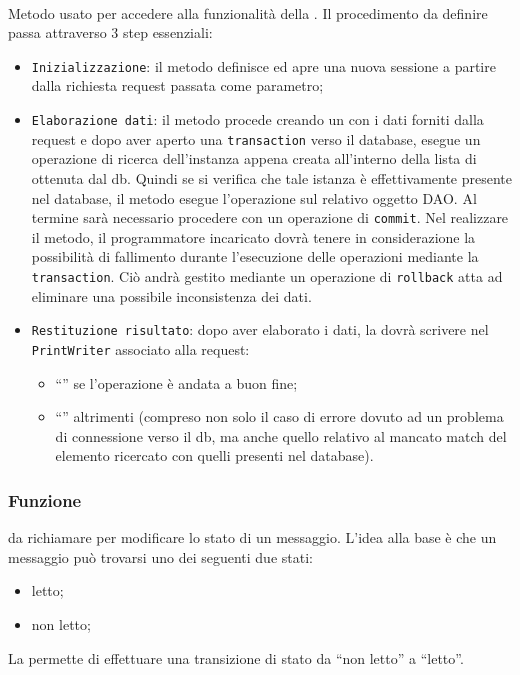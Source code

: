 \begin{description}
	\item{}\\
	Metodo usato per accedere alla funzionalità della . Il procedimento da definire passa attraverso 3 step essenziali:
	\begin{itemize}
		\item \texttt{Inizializzazione}: il metodo definisce ed apre una nuova sessione a partire dalla richiesta request passata come parametro;
		\item \texttt{Elaborazione dati}: il metodo procede creando un  con i dati forniti dalla request e dopo aver aperto una \texttt{transaction} verso il database, esegue un operazione di ricerca dell'instanza appena creata all'interno della lista di  ottenuta dal db. Quindi se si verifica che tale istanza è effettivamente presente nel database, il metodo esegue l'operazione  sul relativo oggetto DAO. Al termine sarà necessario procedere con un operazione di \texttt{commit}. Nel realizzare il metodo, il programmatore incaricato dovrà tenere in considerazione la possibilità di fallimento durante l'esecuzione delle operazioni mediante la \texttt{transaction}. Ciò andrà gestito mediante un operazione di \texttt{rollback} atta ad eliminare una possibile inconsistenza dei dati.
		\item \texttt{Restituzione risultato}: dopo aver elaborato i dati, la  dovrà scrivere nel \texttt{PrintWriter} associato alla request:
			\begin{itemize}
				\item ``'' se l'operazione è andata a buon fine;
				\item ``'' altrimenti (compreso non solo il caso di errore dovuto ad un problema di connessione verso il db, ma anche quello relativo al mancato match del elemento ricercato con quelli presenti nel database).
			\end{itemize}
	\end{itemize}

\end{description}


\subsubsection*{Funzione}
 da richiamare per modificare lo stato di un messaggio. L'idea alla base è che un messaggio può trovarsi uno dei seguenti due stati:
\begin{itemize}
	\item letto;
	\item non letto;
\end{itemize}
La  permette di effettuare una transizione di stato da ``non letto'' a ``letto''.


